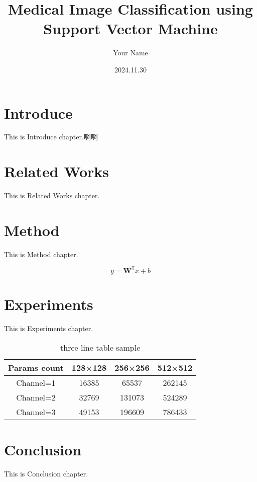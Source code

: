 \documentclass[twocolumn]{article}
\title{Medical Image Classification using Support Vector Machine}
\author{Your Name}
\date{2024.11.30}
\begin{document}

\section{Introduce}
This is Introduce chapter.啊啊

\section{Related Works}
This is Related Works chapter.

\section{Method}
This is Method chapter.

\[
	y = \mathbf{W}^{\mathbb{T}}x + b
\]

\section{Experiments}
This is Experiments chapter.
\begin{table}[h]
	\centering
	\caption{three line table sample}
	\begin{tabular}{cccc}
		\toprule
		Params count & 128×128 & 256×256 & 512×512 \\
		\midrule
		Channel=1    & 16385   & 65537   & 262145  \\
		Channel=2    & 32769   & 131073  & 524289  \\
		Channel=3    & 49153   & 196609  & 786433  \\
		\bottomrule
	\end{tabular}
\end{table}

\section{Conclusion}
This is Conclusion chapter.
\end{document}
